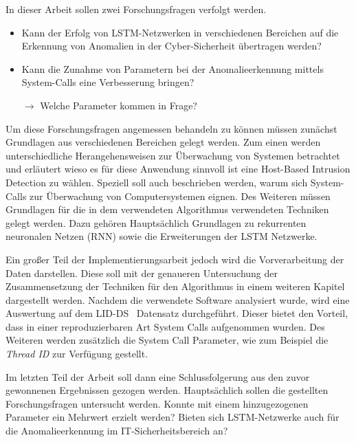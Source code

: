 In dieser Arbeit sollen zwei Forschungsfragen verfolgt werden.
\begin{itemize}
    \item Kann der Erfolg von LSTM-Netzwerken in verschiedenen Bereichen auf die Erkennung von Anomalien in der Cyber-Sicherheit übertragen werden?
    \item Kann die Zunahme von Parametern bei der Anomalieerkennung mittels System-Calls eine Verbesserung bringen?

        $\rightarrow$ Welche Parameter kommen in Frage?
\end{itemize}

Um diese Forschungsfragen angemessen behandeln zu können müssen zunächst Grundlagen aus verschiedenen Bereichen gelegt werden.
Zum einen werden unterschiedliche Herangehensweisen zur Überwachung von Systemen betrachtet und erläutert wieso es für diese Anwendung sinnvoll ist eine Host-Based Intrusion Detection zu wählen.
Speziell soll auch beschrieben werden, warum sich System-Calls zur Überwachung von Computersystemen eignen.
Des Weiteren müssen Grundlagen für die in dem verwendeten Algorithmus verwendeten Techniken gelegt werden.
Dazu gehören Hauptsächlich Grundlagen zu rekurrenten neuronalen Netzen (RNN) sowie die Erweiterungen der LSTM Netzwerke.

Ein großer Teil der Implementierungsarbeit jedoch wird die Vorverarbeitung der Daten darstellen.
Diese soll mit der genaueren Untersuchung der Zusammensetzung der Techniken für den Algorithmus in einem weiteren Kapitel dargestellt werden.
Nachdem die verwendete Software analysiert wurde, wird eine Auswertung auf dem LID-DS~\cite{LID-DS} Datensatz durchgeführt.
Dieser bietet den Vorteil, dass in einer reproduzierbaren Art System Calls aufgenommen wurden.
Des Weiteren werden zusätzlich die System Call Parameter, wie zum Beispiel die \textit{Thread ID} zur Verfügung gestellt.

Im letzten Teil der Arbeit soll dann eine Schlussfolgerung aus den zuvor gewonnenen Ergebnissen gezogen werden. 
Hauptsächlich sollen die gestellten Forschungsfragen untersucht werden.
Konnte mit einem hinzugezogenen Parameter ein Mehrwert erzielt werden?
Bieten sich LSTM-Netzwerke auch für die Anomalieerkennung im IT-Sicherheitsbereich an?
